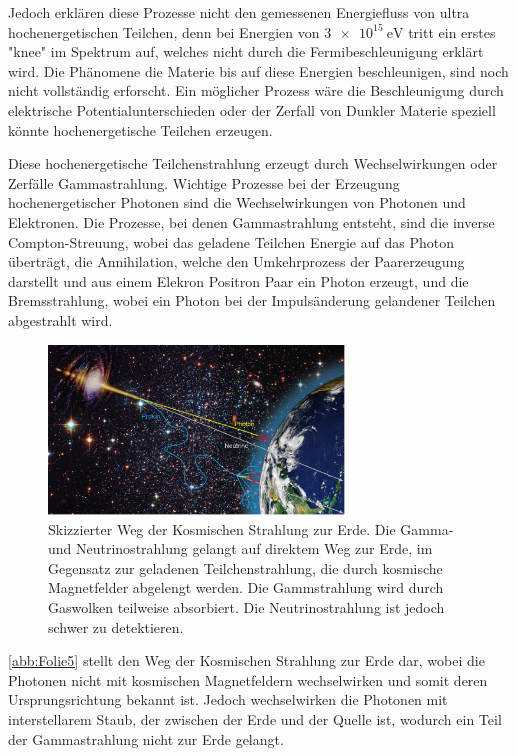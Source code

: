 Jedoch erklären diese Prozesse nicht den gemessenen Energiefluss von ultra hochenergetischen Teilchen, denn bei Energien von $\SI{3e15}{\eV}$ tritt ein erstes
"knee" im Spektrum auf, welches nicht durch die Fermibeschleunigung erklärt wird.
Die Phänomene die Materie bis auf diese Energien beschleunigen, sind noch nicht vollständig erforscht.
Ein möglicher Prozess wäre die Beschleunigung durch elektrische Potentialunterschieden oder der Zerfall von Dunkler Materie speziell könnte
hochenergetische Teilchen erzeugen.

Diese hochenergetische Teilchenstrahlung erzeugt durch Wechselwirkungen oder Zerfälle Gammastrahlung.
Wichtige Prozesse bei der Erzeugung hochenergetischer Photonen sind die Wechselwirkungen von Photonen und Elektronen.
Die Prozesse, bei denen Gammastrahlung entsteht, sind die inverse Compton-Streuung, wobei das geladene Teilchen Energie auf das Photon
überträgt, die Annihilation, welche den Umkehrprozess der Paarerzeugung darstellt und aus einem Elekron Positron Paar
ein Photon erzeugt, und die Bremsstrahlung, wobei ein Photon bei der Impulsänderung gelandener Teilchen abgestrahlt wird.

\begin{figure}
  \includegraphics[width=0.7\textwidth]{Plots/Folie5.JPG}
  \centering
  \caption{Skizzierter Weg der Kosmischen Strahlung zur Erde. Die Gamma- und Neutrinostrahlung gelangt auf direktem Weg zur Erde, im Gegensatz
            zur geladenen Teilchenstrahlung, die durch kosmische Magnetfelder abgelengt werden. Die Gammstrahlung wird durch Gaswolken teilweise
            absorbiert. Die Neutrinostrahlung ist jedoch schwer zu detektieren.}
  \label{abb:Folie5}
\end{figure}

\autoref{abb:Folie5} stellt den Weg der Kosmischen Strahlung zur Erde dar, wobei die Photonen nicht mit kosmischen Magnetfeldern wechselwirken
und somit deren Ursprungsrichtung bekannt ist. Jedoch wechselwirken die Photonen mit interstellarem Staub, der zwischen der Erde und der
Quelle ist, wodurch ein Teil der Gammastrahlung nicht zur Erde gelangt.

